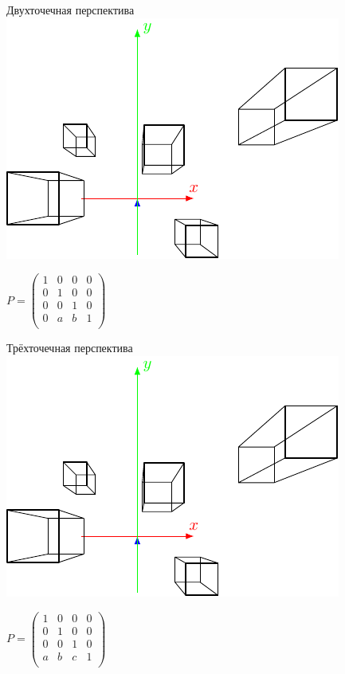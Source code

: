 \documentclass[10pt]{beamer}
\begin{document}
\begin{frame}{Двухточечная перспектива}	  
	\centering
	{
		\includegraphics[page=2, width=\textwidth]{cube projective true multiple xy.pdf} 
	}
	{	
	
			$P = 
			\begin{pmatrix}
				1&0&0&0\\
				0&1&0&0\\	
				0&0&1&0\\	
				0&a&b&1\\		
			\end{pmatrix}$
		
		
	}
	
\end{frame}

\begin{frame}{Трёхточечная перспектива}	  
	\centering
	{
		\includegraphics[page=3, width=\textwidth]{cube projective true multiple xy.pdf} 
	}
	{	
		
		$P = 
		\begin{pmatrix}
			1&0&0&0\\
			0&1&0&0\\	
			0&0&1&0\\	
			a&b&c&1\\		
		\end{pmatrix}$
		
		
	}
	
\end{frame}

\end{document}
